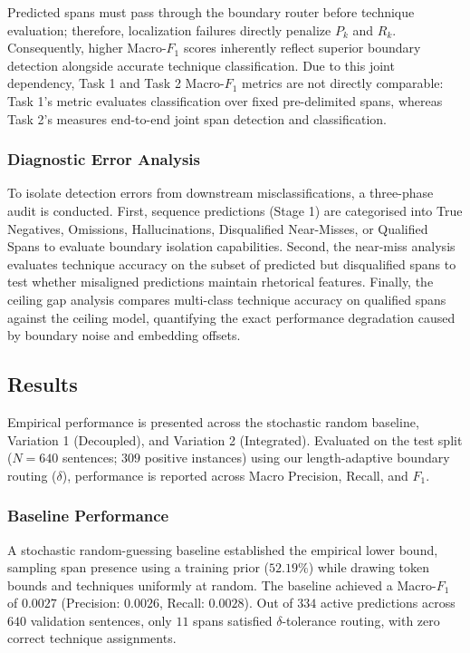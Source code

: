 \documentclass[12pt, a4paper]{article}
\begin{document}
Predicted spans must pass through the boundary router before technique evaluation; therefore, localization failures directly penalize $P_k$ and $R_k$. Consequently, higher Macro-$F_1$ scores inherently reflect superior boundary detection alongside accurate technique classification. Due to this joint dependency, Task 1 and Task 2 Macro-$F_1$ metrics are not directly comparable: Task 1's metric evaluates classification over fixed pre-delimited spans, whereas Task 2's measures end-to-end joint span detection and classification.

\subsubsection{Diagnostic Error Analysis}
\label{subsubsec:task2_diagnostic_error}

To isolate detection errors from downstream misclassifications, a three-phase audit is conducted. First, sequence predictions (Stage 1) are categorised into True Negatives, Omissions, Hallucinations, Disqualified Near-Misses, or Qualified Spans to evaluate boundary isolation capabilities. Second, the near-miss analysis evaluates technique accuracy on the subset of predicted but disqualified spans to test whether misaligned predictions maintain rhetorical features. Finally, the ceiling gap analysis compares multi-class technique accuracy on qualified spans against the ceiling model, quantifying the exact performance degradation caused by boundary noise and embedding offsets.

\subsection{Results}
\label{subsec:task2_results}

Empirical performance is presented across the stochastic random baseline, Variation 1 (Decoupled), and Variation 2 (Integrated). Evaluated on the test split ($N = 640$ sentences; $309$ positive instances) using our length-adaptive boundary routing ($\delta$), performance is reported across Macro Precision, Recall, and $F_1$.

\subsubsection{Baseline Performance}
\label{subsubsec:task2_baseline_results}

A stochastic random-guessing baseline established the empirical lower bound, sampling span presence using a training prior ($52.19\%$) while drawing token bounds and techniques uniformly at random. The baseline achieved a Macro-$F_1$ of $0.0027$ (Precision: $0.0026$, Recall: $0.0028$). Out of $334$ active predictions across $640$ validation sentences, only $11$ spans satisfied $\delta$-tolerance routing, with zero correct technique assignments.
\end{document}
